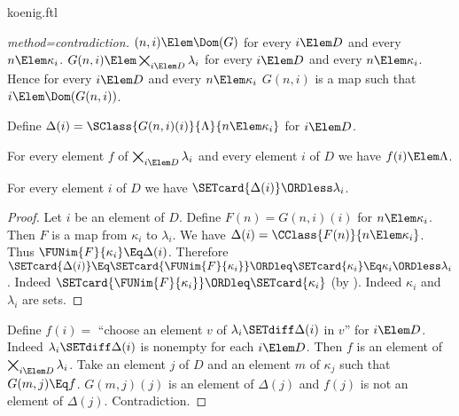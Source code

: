 \documentclass{stex}
\newcommand{\ProdSet}[2]{\bigtimes_{i \Elem #2} #1_{i}}
\begin{document}
\begin{smodule}{koenig.ftl}
\begin{forthel}
\begin{proof}[method=contradiction]
    $(n,i) \Elem \Dom(G)$ for every $i \Elem D$ and every $n \Elem \kappa_{i}$.
    $G(n,i) \Elem \ProdSet{\lambda}{D}$ for every $i \Elem D$ and every $n \Elem \kappa_{i}$.
    Hence for every $i \Elem D$ and every $n \Elem \kappa_{i}$ $G(n,i)$ is a map such that $i \Elem \Dom(G(n,i))$.

    Define $\Delta(i) = \SClass{G(n,i)(i)}{\Lambda}{n \Elem \kappa_{i}}$ for $i \Elem D$.

    For every element $f$ of $\ProdSet{\lambda}{D}$ and every element $i$ of $D$ we have $f(i) \Elem \Lambda$.

    For every element $i$ of $D$ we have $\SETcard{\Delta(i)} \ORDless \lambda_{i}$.
    \begin{proof}
      Let $i$ be an element of $D$.
      Define $F(n) = G(n,i)(i)$ for $n \Elem \kappa_{i}$.
      Then $F$ is a map from $\kappa_{i}$ to $\lambda_{i}$.
      We have $\Delta(i) = \CClass{F(n)}{n \Elem \kappa_{i}}$.
      Thus $\FUNim{F}{\kappa_{i}} \Eq \Delta(i)$.
      Therefore $\SETcard{\Delta(i)}
        \Eq \SETcard{\FUNim{F}{\kappa_{i}}}
        \ORDleq \SETcard{\kappa_{i}}
        \Eq \kappa_{i}
        \ORDless \lambda_{i}$.
      Indeed $\SETcard{\FUNim{F}{\kappa_{i}}} \ORDleq \SETcard{\kappa_{i}}$ (by ).
      Indeed $\kappa_{i}$ and $\lambda_{i}$ are sets.
    \end{proof}

    Define $f(i) =$ ``choose an element $v$ of $\lambda_{i} \SETdiff \Delta(i)$ in $v$'' for $i \Elem D$.
    Indeed $\lambda_{i} \SETdiff \Delta(i)$ is nonempty for each $i \Elem D$.
    Then $f$ is an element of $\ProdSet{\lambda}{D}$.
    Take an element $j$ of $D$ and an element $m$ of $\kappa_{j}$ such that $G(m,j) \Eq f$.
    $G(m,j)(j)$ is an element of $\Delta(j)$ and $f(j)$ is not an element of $\Delta(j)$.
    Contradiction.
  \end{proof}
\end{forthel}

\printbibliography
{}
\end{smodule}
\end{document}
